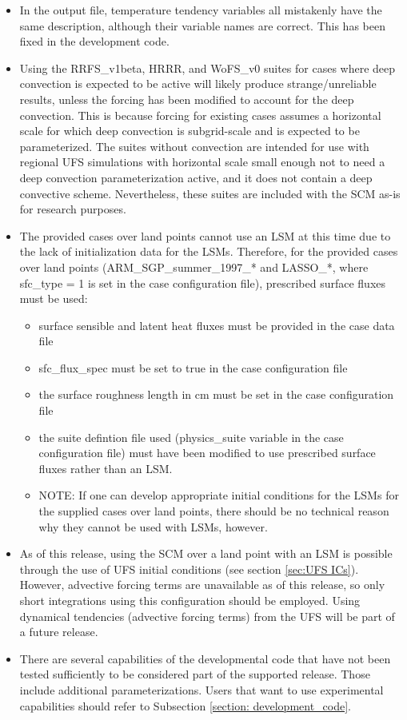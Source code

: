 \begin{itemize}
\item In the output file, temperature tendency variables all mistakenly have the same description, although their variable names are correct. This has been fixed in the development code.
\item Using the RRFS\_v1beta, HRRR, and WoFS\_v0 suites for cases where deep convection is expected to be active will likely produce strange/unreliable results, unless the forcing has been modified to account for the deep convection. This is because forcing for existing cases assumes a horizontal scale for which deep convection is subgrid-scale and is expected to be parameterized. The  suites without convection are intended for use with regional UFS simulations with horizontal scale small enough not to need a deep convection parameterization active, and it does not contain a deep convective scheme. Nevertheless, these suites are included with the SCM as-is for research purposes.
\item The provided cases over land points cannot use an LSM at this time due to the lack of initialization data for the LSMs. Therefore, for the provided cases over land points (ARM\_SGP\_summer\_1997\_* and LASSO\_*, where sfc\_type = 1 is set in the case configuration file), prescribed surface fluxes must be used:
\begin{itemize}
\item surface sensible and latent heat fluxes must be provided in the case data file
\item sfc\_flux\_spec must be set to true in the case configuration file
\item the surface roughness length in cm must be set in the case configuration file
\item the suite defintion file used (physics\_suite variable in the case configuration file) must have been modified to use prescribed surface fluxes rather than an LSM.
\item NOTE: If one can develop appropriate initial conditions for the LSMs for the supplied cases over land points, there should be no technical reason why they cannot be used with LSMs, however.
\end{itemize}
\item As of this release, using the SCM over a land point with an LSM is possible through the use of UFS initial conditions (see section \ref{sec:UFS ICs}). However, advective forcing terms are unavailable as of this release, so only short integrations using this configuration should be employed. Using dynamical tendencies (advective forcing terms) from the UFS will be part of a future release.
\item There are several capabilities of the developmental code that have not been tested sufficiently to be considered part of the supported release. Those include additional parameterizations. Users that want to use experimental capabilities should refer to Subsection \ref{section: development_code}.
\end{itemize}
